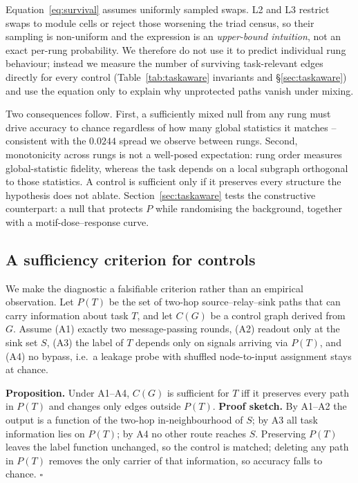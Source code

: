 \documentclass[10pt,twocolumn,letterpaper]{article}
\begin{document}
Equation~\eqref{eq:survival} assumes uniformly sampled swaps. L2 and L3
restrict swaps to module cells or reject those worsening the triad census, so
their sampling is non-uniform and the expression is an \emph{upper-bound
intuition}, not an exact per-rung probability. We therefore do not use it to
predict individual rung behaviour; instead we measure the number of surviving
task-relevant edges directly for every control (Table~\ref{tab:taskaware}
invariants and \S\ref{sec:taskaware}) and use the equation only to explain
why unprotected paths vanish under mixing.

Two consequences follow. First, a sufficiently mixed null from any rung must
drive accuracy to chance regardless of how many global statistics it matches
-- consistent with the $0.0244$ spread we observe between rungs. Second,
monotonicity across rungs is not a well-posed expectation: rung order
measures global-statistic fidelity, whereas the task depends on a local
subgraph orthogonal to those statistics. A control is sufficient only if it
preserves every structure the hypothesis does not ablate. Section~\ref{sec:taskaware}
tests the constructive counterpart: a null that protects $P$ while randomising
the background, together with a motif-dose--response curve.

\subsection{A sufficiency criterion for controls}
\label{sec:criterion}

We make the diagnostic a falsifiable criterion rather than an empirical
observation. Let $P(T)$ be the set of two-hop source--relay--sink paths that
can carry information about task $T$, and let $C(G)$ be a control graph derived
from $G$. Assume (A1) exactly two message-passing rounds, (A2) readout only at
the sink set $S$, (A3) the label of $T$ depends only on signals arriving via
$P(T)$, and (A4) no bypass, i.e.\ a leakage probe with shuffled node-to-input
assignment stays at chance.

\textbf{Proposition.} Under A1--A4, $C(G)$ is sufficient for $T$ iff it
preserves every path in $P(T)$ and changes only edges outside $P(T)$.
\textbf{Proof sketch.} By A1--A2 the output is a function of the two-hop
in-neighbourhood of $S$; by A3 all task information lies on $P(T)$; by A4 no
other route reaches $S$. Preserving $P(T)$ leaves the label function
unchanged, so the control is matched; deleting any path in $P(T)$ removes the
only carrier of that information, so accuracy falls to chance. $\square$
\end{document}
